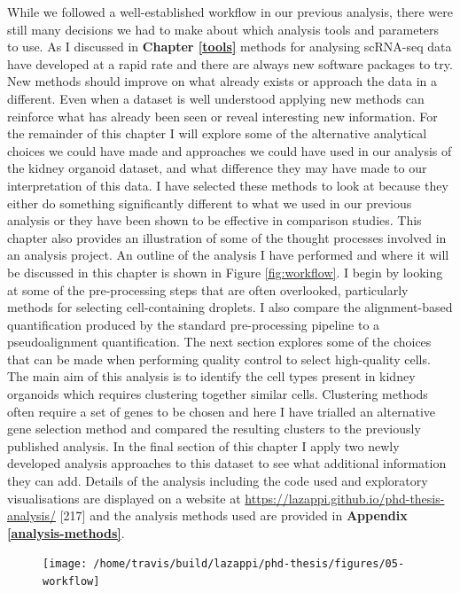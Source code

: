 \documentclass[11pt,a4paper,titlepage,twoside,openright]{style/unimelbthesis}
\theoremstyle{definition}
\theoremstyle{definition}
\theoremstyle{definition}
\theoremstyle{remark}
\begin{document}
\begin{mainmatter}
While we followed a well-established workflow in our previous analysis, there were still many decisions we had to make about which analysis tools and parameters to use. As I discussed in \textbf{Chapter \ref{tools}} methods for analysing scRNA-seq data have developed at a rapid rate and there are always new software packages to try. New methods should improve on what already exists or approach the data in a different. Even when a dataset is well understood applying new methods can reinforce what has already been seen or reveal interesting new information. For the remainder of this chapter I will explore some of the alternative analytical choices we could have made and approaches we could have used in our analysis of the kidney organoid dataset, and what difference they may have made to our interpretation of this data. I have selected these methods to look at because they either do something significantly different to what we used in our previous analysis or they have been shown to be effective in comparison studies. This chapter also provides an illustration of some of the thought processes involved in an analysis project. An outline of the analysis I have performed and where it will be discussed in this chapter is shown in Figure \ref{fig:workflow}. I begin by looking at some of the pre-processing steps that are often overlooked, particularly methods for selecting cell-containing droplets. I also compare the alignment-based quantification produced by the standard pre-processing pipeline to a pseudoalignment quantification. The next section explores some of the choices that can be made when performing quality control to select high-quality cells. The main aim of this analysis is to identify the cell types present in kidney organoids which requires clustering together similar cells. Clustering methods often require a set of genes to be chosen and here I have trialled an alternative gene selection method and compared the resulting clusters to the previously published analysis. In the final section of this chapter I apply two newly developed analysis approaches to this dataset to see what additional information they can add. Details of the analysis including the code used and exploratory visualisations are displayed on a website at \url{https://lazappi.github.io/phd-thesis-analysis/} {[}217{]} and the analysis methods used are provided in \textbf{Appendix \ref{analysis-methods}}.

\begin{figure}

{\centering \texttt{[image: /home/travis/build/lazappi/phd-thesis/figures/05-workflow]} 

}
\end{figure}
\end{mainmatter}
\end{document}

